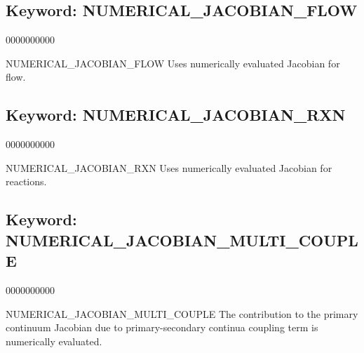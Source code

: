 \hyperlink{target_key}{\return}


\newpage
\protect\hypertarget{target_numjac_flow}{}

\subsection{Keyword: NUMERICAL\_JACOBIAN\_FLOW}
\begin{deflist}{0000000000}
\item[NUMERICAL\_JACOBIAN\_FLOW] 
Uses numerically evaluated Jacobian for flow.
\end{deflist}

\hyperlink{target_key}{\return}



\newpage
\protect\hypertarget{target_numjac_rxn}{}

\subsection{Keyword: NUMERICAL\_JACOBIAN\_RXN}
\begin{deflist}{0000000000}
\item[NUMERICAL\_JACOBIAN\_RXN]
Uses numerically evaluated Jacobian for reactions.
\end{deflist}

\hyperlink{target_key}{\return}



\newpage
\protect\hypertarget{target_numjac_multi}{}

\subsection{Keyword: NUMERICAL\_JACOBIAN\_MULTI\_COUPLE}
\begin{deflist}{0000000000}
\item[NUMERICAL\_JACOBIAN\_MULTI\_COUPLE]
The contribution to the primary continuum Jacobian due to primary-secondary continua coupling term is numerically evaluated.
\end{deflist}

\hyperlink{target_key}{\return}


